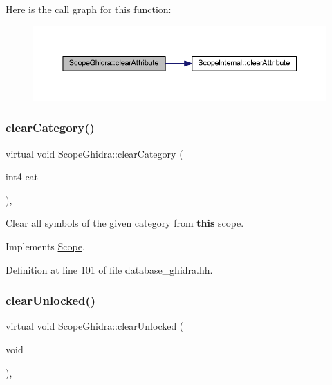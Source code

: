 Here is the call graph for this function\+:
\nopagebreak
\begin{figure}[H]
\begin{center}
\leavevmode
\includegraphics[width=350pt]{class_scope_ghidra_a82f1b5f561b339b03471d39349d108dd_cgraph}
\end{center}
\end{figure}
\mbox{\label{class_scope_ghidra_a7c52834934353c6d92f5ae459d08e2ad}} 
\subsubsection{\texorpdfstring{clearCategory()}{clearCategory()}}
{\footnotesize\ttfamily virtual void Scope\+Ghidra\+::clear\+Category (\begin{DoxyParamCaption}\item[{int4}]{cat }\end{DoxyParamCaption})\hspace{0.3cm}{\ttfamily [inline]}, {\ttfamily [virtual]}}



Clear all symbols of the given category from {\bfseries{this}} scope. 



Implements \mbox{\hyperlink{class_scope_ab3c8275b6500a9cc620cc31f32ed267e}{Scope}}.



Definition at line 101 of file database\+\_\+ghidra.\+hh.

\mbox{\label{class_scope_ghidra_a32e0189b87b6c66641c7de9baf118457}} 
\subsubsection{\texorpdfstring{clearUnlocked()}{clearUnlocked()}}
{\footnotesize\ttfamily virtual void Scope\+Ghidra\+::clear\+Unlocked (\begin{DoxyParamCaption}\item[{void}]{ }\end{DoxyParamCaption})\hspace{0.3cm}{\ttfamily [inline]}, {\ttfamily [virtual]}}



